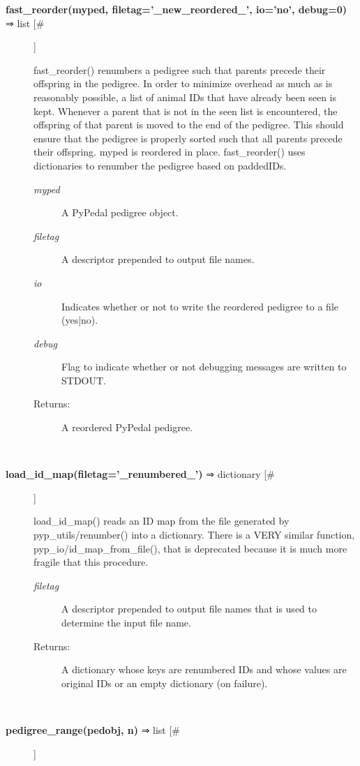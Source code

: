 \begin{description}
\item[\textbf{fast\_reorder(myped, filetag='\_new\_reordered\_', io='no', debug=0)}
 ⇒ list [\#]]

 fast\_reorder() renumbers a pedigree such that parents precede their offspring in the pedigree. In order to minimize overhead as much as is reasonably possible, a list of animal IDs that have already been seen is kept. Whenever a parent that is not in the seen list is encountered, the offspring of that parent is moved to the end of the pedigree. This should ensure that the pedigree is properly sorted such that all parents precede their offspring. myped is reordered in place. fast\_reorder() uses dictionaries to renumber the pedigree based on paddedIDs.
\begin{description}
\item[\emph{myped}
] A PyPedal pedigree object.
\item[\emph{filetag}
] A descriptor prepended to output file names.
\item[\emph{io}
] Indicates whether or not to write the reordered pedigree to a file (yes|no).
\item[\emph{debug}
] Flag to indicate whether or not debugging messages are written to STDOUT.
\item[Returns:] A reordered PyPedal pedigree.

\end{description}
\\ 

\item[\textbf{load\_id\_map(filetag='\_renumbered\_')}
 ⇒ dictionary [\#]]

 load\_id\_map() reads an ID map from the file generated by pyp\_utils/renumber() into a dictionary. There is a VERY similar function, pyp\_io/id\_map\_from\_file(), that is deprecated because it is much more fragile that this procedure.
\begin{description}
\item[\emph{filetag}
] A descriptor prepended to output file names that is used to determine the input file name.
\item[Returns:] A dictionary whose keys are renumbered IDs and whose values are original IDs or an empty dictionary (on failure).

\end{description}
\\ 

\item[\textbf{pedigree\_range(pedobj, n)}
 ⇒ list [\#]]


\end{description}
